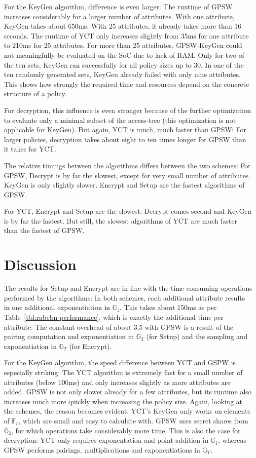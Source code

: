 For the KeyGen algorithm, difference is even larger:
The runtime of GPSW increases considerably for a larger number of attributes.
With one attribute, KeyGen takes about 650ms. With 25 attributes, it already takes more than 16 seconds.
The runtime of YCT only increases slightly from 35ms for one attribute to 210ms for 25 attributes.
For more than 25 attributes, GPSW-KeyGen could not meaningfully be evaluated on the SoC due to lack of RAM.
Only for two of the ten sets, KeyGen ran successfully for all policy sizes up to 30.
In one of the ten randomly generated sets, KeyGen already failed with only nine attributes.
This shows how strongly the required time and resources depend on the concrete structure of a policy.

For decryption, this influence is even stronger because of the further optimization to evaluate only a minimal subset of the \gls{access-tree} (this optimization is not applicable for KeyGen).
But again, YCT is much, much faster than GPSW: For larger policies, decryption takes about eight to ten times longer for GPSW than it takes for YCT.

The relative timings between the algorithms differs between the two schemes:
For GPSW, Decrypt is by far the slowest, except for very small number of attributes. KeyGen is only slightly slower.
Encrypt and Setup are the fastest algorithms of GPSW.

For YCT, Encrypt and Setup are the slowest.
Decrypt comes second and KeyGen is by far the fastest.
But still, the slowest algorithms of YCT are much faster than the fastest of GPSW.


\section{Discussion}
The results for Setup and Encrypt are in line with the time-consuming operations performed by the algorithms: 
In both schemes, each additional attribute results in one additional exponentiation in $\mathbb{G}_1$.
This takes about 150ms as per Table~\ref{tbl:rabebn-performance}, which is exactly the additional time per attribute.
The constant overhead of about 3.5 with GPSW is a result of the pairing computation and exponentiation in $\mathbb{G}_T$ (for Setup) and the sampling and exponentiation in $\mathbb{G}_T$ (for Encrypt).

For the KeyGen algorithm, the speed difference between YCT and GSPW is especially striking: 
The YCT algorithm is extremely fast for a small number of attributes (below 100ms) and only increases slightly as more attributes are added.
GPSW is not only slower already for a few attributes, but its runtime also increases much more quickly when increasing the policy size.
Again, looking at the schemes, the reason becomes evident: YCT's KeyGen only works on elements of $\mathbb{F}_r$, which are small and easy to calculate with.
GPSW uses secret shares from $\mathbb{G}_2$, for which operations take considerably more time.
This is also the case for decryption: YCT only requires exponentation and point addition in $\mathbb{G}_1$, whereas GPSW performs pairings, multiplications and exponentiations in $\mathbb{G}_T$.

